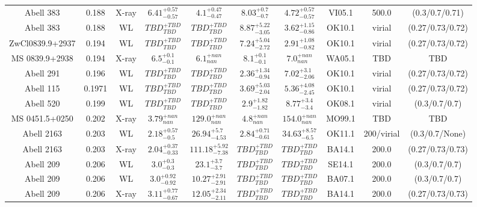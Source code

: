 \begin{table}
\begin{tabular}{cccccccccc}
Abell 383 & 0.188 & X-ray & ${6.41}^{+0.57}_{-0.57}$ & ${4.1}^{+0.47}_{-0.47}$ & ${8.03}^{+0.7}_{-0.7}$ & ${4.72}^{+0.57}_{-0.57}$ & VI05.1 & 500.0 & (0.3/0.7/0.71) \\
Abell 383 & 0.188 & WL & ${TBD}^{+TBD}_{TBD}$ & ${TBD}^{+TBD}_{TBD}$ & ${8.87}^{+5.22}_{-3.05}$ & ${3.62}^{+1.15}_{-0.86}$ & OK10.1 & virial & (0.27/0.73/0.72) \\
ZwCl0839.9+2937 & 0.194 & WL & ${TBD}^{+TBD}_{TBD}$ & ${TBD}^{+TBD}_{TBD}$ & ${7.24}^{+5.04}_{-2.72}$ & ${2.91}^{+1.08}_{-0.82}$ & OK10.1 & virial & (0.27/0.73/0.72) \\
MS 0839.9+2938 & 0.194 & X-ray & ${6.5}^{+0.1}_{-0.1}$ & ${6.1}^{+nan}_{nan}$ & ${8.1}^{+0.1}_{-0.1}$ & ${7.0}^{+nan}_{nan}$ & WA05.1 & TBD & TBD \\
Abell 291 & 0.196 & WL & ${TBD}^{+TBD}_{TBD}$ & ${TBD}^{+TBD}_{TBD}$ & ${2.36}^{+1.34}_{-0.94}$ & ${7.02}^{+3.1}_{-2.06}$ & OK10.1 & virial & (0.27/0.73/0.72) \\
Abell 115 & 0.1971 & WL & ${TBD}^{+TBD}_{TBD}$ & ${TBD}^{+TBD}_{TBD}$ & ${3.69}^{+5.03}_{-2.04}$ & ${5.36}^{+4.08}_{-2.45}$ & OK10.1 & virial & (0.27/0.73/0.72) \\
Abell 520 & 0.199 & WL & ${TBD}^{+TBD}_{TBD}$ & ${TBD}^{+TBD}_{TBD}$ & ${2.9}^{+1.82}_{-1.82}$ & ${8.77}^{+3.4}_{-3.4}$ & OK08.1 & virial & (0.3/0.7/0.7) \\
MS 0451.5+0250 & 0.202 & X-ray & ${3.79}^{+nan}_{nan}$ & ${129.0}^{+nan}_{nan}$ & ${4.8}^{+nan}_{nan}$ & ${154.0}^{+nan}_{nan}$ & MO99.1 & TBD & TBD \\
Abell 2163 & 0.203 & WL & ${2.18}^{+0.57}_{-0.5}$ & ${26.94}^{+5.7}_{-4.53}$ & ${2.84}^{+0.71}_{-0.61}$ & ${34.63}^{+8.57}_{-6.5}$ & OK11.1 & 200/virial & (0.3/0.7/None) \\
Abell 2163 & 0.203 & X-ray & ${2.04}^{+0.37}_{-0.33}$ & ${111.18}^{+5.92}_{-7.38}$ & ${TBD}^{+TBD}_{TBD}$ & ${TBD}^{+TBD}_{TBD}$ & BA14.1 & 200.0 & (0.27/0.73/0.73) \\
Abell 209 & 0.206 & WL & ${3.0}^{+0.3}_{-0.3}$ & ${23.1}^{+3.7}_{-3.7}$ & ${TBD}^{+TBD}_{TBD}$ & ${TBD}^{+TBD}_{TBD}$ & SE14.1 & 200.0 & (0.3/0.7/0.7) \\
Abell 209 & 0.206 & WL & ${3.0}^{+0.92}_{-0.92}$ & ${10.27}^{+2.91}_{-2.91}$ & ${TBD}^{+TBD}_{TBD}$ & ${TBD}^{+TBD}_{TBD}$ & BA07.1 & 200.0 & (0.3/0.7/0.7) \\
Abell 209 & 0.206 & X-ray & ${3.11}^{+0.77}_{-0.67}$ & ${12.05}^{+2.34}_{-2.11}$ & ${TBD}^{+TBD}_{TBD}$ & ${TBD}^{+TBD}_{TBD}$ & BA14.1 & 200.0 & (0.27/0.73/0.73) \\

\end{tabular}
\end{table}
